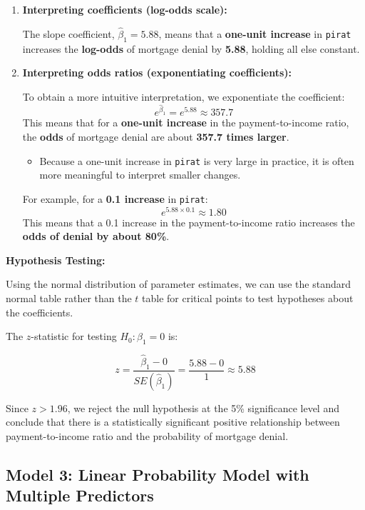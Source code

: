 \documentclass[
  12pt,
  letterpaper,
]{scrbook}
\providecommand{\tightlist}{%
  \setlength{\itemsep}{0pt}\setlength{\parskip}{0pt}}
\renewcommand{\tightlist}{\setlength{\itemsep}{0.5\baselineskip}\setlength{\parskip}{0.2\baselineskip}}
\theoremstyle{plain}
\theoremstyle{definition}
\theoremstyle{remark}
\begin{document}
\begin{enumerate}
\def\labelenumi{\arabic{enumi}.}
\item
  \textbf{Interpreting coefficients (log-odds scale):}

  The slope coefficient, \(\hat{\beta}_1 = 5.88\), means that a
  \textbf{one-unit increase} in \texttt{pirat} increases the
  \textbf{log-odds} of mortgage denial by \textbf{5.88}, holding all
  else constant.
\item
  \textbf{Interpreting odds ratios (exponentiating coefficients):}

  To obtain a more intuitive interpretation, we exponentiate the
  coefficient: \[
  e^{\hat{\beta}_1} = e^{5.88} \approx 357.7
  \] This means that for a \textbf{one-unit increase} in the
  payment-to-income ratio, the \textbf{odds} of mortgage denial are
  about \textbf{357.7 times larger}.

  \begin{itemize}
  \tightlist
  \item
    Because a one-unit increase in \texttt{pirat} is very large in
    practice, it is often more meaningful to interpret smaller changes.
  \end{itemize}

  For example, for a \textbf{0.1 increase} in \texttt{pirat}: \[
  e^{5.88 \times 0.1} \approx 1.80
  \] This means that a 0.1 increase in the payment-to-income ratio
  increases the \textbf{odds of denial by about 80\%}.
\end{enumerate}

\textbf{Hypothesis Testing:}

Using the normal distribution of parameter estimates, we can use the
standard normal table rather than the \(t\) table for critical points to
test hypotheses about the coefficients.

The \(z\)-statistic for testing \(H_0: \beta_1 = 0\) is:

\[
z = \frac{\hat{\beta}_1 - 0}{SE(\hat{\beta}_1)} = \frac{5.88 - 0}{1} \approx 5.88
\]

Since \(z > 1.96\), we reject the null hypothesis at the 5\%
significance level and conclude that there is a statistically
significant positive relationship between payment-to-income ratio and
the probability of mortgage denial.

\subsection{Model 3: Linear Probability Model with Multiple
Predictors}\label{model-3-linear-probability-model-with-multiple-predictors}
\end{document}
